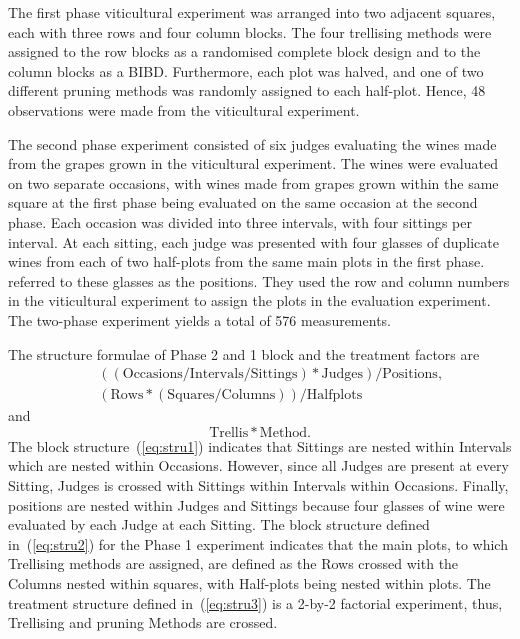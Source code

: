 \documentclass[article]{jss}
\begin{document}

The first phase viticultural experiment was arranged into two adjacent squares, each with three rows and four column blocks. The four trellising methods were assigned to the row blocks as a randomised complete block design and to the column blocks as a BIBD. Furthermore, each plot was halved, and one of two different pruning methods was randomly assigned to each half-plot. Hence, 48 observations were made from the viticultural experiment.

The second phase experiment consisted of six judges evaluating the wines made from the grapes grown in the viticultural experiment. The wines were evaluated on two separate occasions, with wines made from grapes grown within the same square at the first phase being evaluated on the same occasion at the second phase. Each occasion was divided into three intervals, with four sittings per interval. At each sitting, each judge was presented with four glasses of duplicate wines from each of two half-plots from the same main plots in the first phase. \cite{Brien1999} referred to these glasses as the positions. They used the row and column numbers in the viticultural experiment to assign the plots in the evaluation experiment. The two-phase experiment yields a total of 576 measurements.

The structure formulae of Phase 2 and 1 block and the treatment factors are
\begin{eqnarray}
\label{eq:stru1}&&\mathrm{((Occasions/Intervals/Sittings)*Judges)/Positions,}\\
\label{eq:stru2}&&\mathrm{(Rows*(Squares/Columns))/Halfplots}
\end{eqnarray}
and
\begin{equation}\label{eq:stru3}
\mathrm{Trellis*Method.}
\end{equation}
The block structure~(\ref{eq:stru1}) indicates that Sittings are nested within Intervals which are nested within Occasions. However, since all Judges are present at every Sitting, Judges is crossed with Sittings within Intervals within Occasions. Finally, positions are nested within Judges and Sittings because four glasses of wine were evaluated by each Judge at each Sitting. The block structure defined in~(\ref{eq:stru2}) for the Phase 1 experiment indicates that the main plots, to which Trellising methods are assigned, are defined as the Rows crossed with the Columns nested within squares, with Half-plots being nested within plots. The treatment structure defined in~(\ref{eq:stru3}) is a 2-by-2 factorial experiment, thus, Trellising and pruning Methods are crossed.
\end{document}

